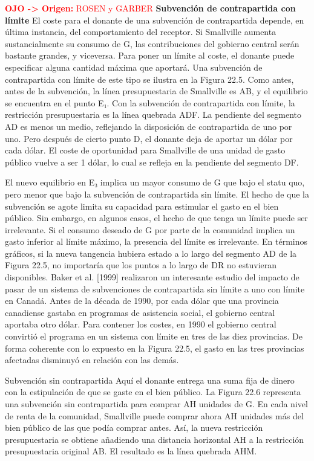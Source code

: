 \documentclass[10pt,a4paper]{article}
\begin{document}
\textcolor{red}{\textbf{OJO -> Origen:} ROSEN y GARBER}
\textbf{Subvención de contrapartida con límite }
El coste para el donante de una subvención de contrapartida depende, en última instancia, del comportamiento del receptor. Si Smallville aumenta sustancialmente su consumo de G, las contribuciones del gobierno central serán bastante grandes, y viceversa. Para poner un límite al coste, el donante puede especificar alguna cantidad máxima que aportará. Una subvención de contrapartida con límite de este tipo se ilustra en la Figura 22.5. Como antes, antes de la subvención, la línea presupuestaria de Smallville es AB, y el equilibrio se encuentra en el punto E₁. Con la subvención de contrapartida con límite, la restricción presupuestaria es la línea quebrada ADF. La pendiente del segmento AD es menos un medio, reflejando la disposición de contrapartida de uno por uno. Pero después de cierto punto D, el donante deja de aportar un dólar por cada dólar. El coste de oportunidad para Smallville de una unidad de gasto público vuelve a ser 1 dólar, lo cual se refleja en la pendiente del segmento DF.

El nuevo equilibrio en E₃ implica un mayor consumo de G que bajo el statu quo, pero menor que bajo la subvención de contrapartida sin límite. El hecho de que la subvención se agote limita su capacidad para estimular el gasto en el bien público. Sin embargo, en algunos casos, el hecho de que tenga un límite puede ser irrelevante. Si el consumo deseado de G por parte de la comunidad implica un gasto inferior al límite máximo, la presencia del límite es irrelevante. En términos gráficos, si la nueva tangencia hubiera estado a lo largo del segmento AD de la Figura 22.5, no importaría que los puntos a lo largo de DR no estuvieran disponibles. Baker et al. [1999] realizaron un interesante estudio del impacto de pasar de un sistema de subvenciones de contrapartida sin límite a uno con límite en Canadá. Antes de la década de 1990, por cada dólar que una provincia canadiense gastaba en programas de asistencia social, el gobierno central aportaba otro dólar. Para contener los costes, en 1990 el gobierno central convirtió el programa en un sistema con límite en tres de las diez provincias. De forma coherente con lo expuesto en la Figura 22.5, el gasto en las tres provincias afectadas disminuyó en relación con las demás.

Subvención sin contrapartida Aquí el donante entrega una suma fija de dinero con la estipulación de que se gaste en el bien público. La Figura 22.6 representa una subvención sin contrapartida para comprar AH unidades de G. En cada nivel de renta de la comunidad, Smallville puede comprar ahora AH unidades más del bien público de las que podía comprar antes. Así, la nueva restricción presupuestaria se obtiene añadiendo una distancia horizontal AH a la restricción presupuestaria original AB. El resultado es la línea quebrada AHM.
\end{document}
